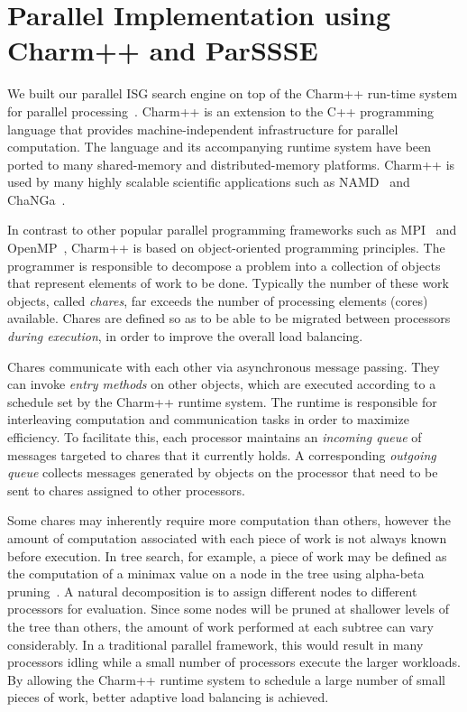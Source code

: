 \documentclass[10pt, conference, compsocconf]{IEEEtran}
\begin{document}
\section{Parallel Implementation using Charm++ and ParSSSE}\label{ParSSSE}
We built our parallel ISG search engine on top of the {\sc Charm++} run-time
system for parallel processing~\cite{kale93charm,kale09charm}.  {\sc Charm++}
is an extension to the C++ programming language that provides
machine-independent infrastructure for parallel computation.  The language and
its accompanying runtime system have been ported to many shared-memory and
distributed-memory platforms. {\sc Charm++} is used by many highly scalable scientific applications such as NAMD~\cite{NAMDIPDPS08} and ChaNGa~\cite{2007_ChaNGaScaling}.

In contrast to other popular parallel programming frameworks such as {\sc MPI}~\cite{MPI}
and {\sc OpenMP}~\cite{OpenMP}, {\sc Charm++} is based on object-oriented
programming principles.  The programmer is responsible to decompose a problem
into a collection of objects that represent elements of work to be done.
Typically the number of these work objects, called {\em chares}, far exceeds
the number of processing elements (cores) available.  Chares are defined
so as to be able to be migrated between processors {\em during execution}, in
order to improve the overall load balancing.  

Chares communicate with each other via
asynchronous message passing.  They can invoke {\em entry methods} on other
objects, which are executed according to a schedule set by the {\sc Charm++}
runtime system.  The runtime is responsible for interleaving computation and
communication tasks in order to maximize efficiency.  To facilitate this, each
processor maintains an {\em incoming queue} of messages targeted to chares that
it currently holds.  A corresponding {\em outgoing queue} collects messages
generated by objects on the processor that need to be sent to chares assigned
to other processors.

Some chares may inherently require more computation than others, however the amount
of computation associated with each piece of work is not always known before
execution.  In tree search, for example, a piece of work may be defined as the
computation of a minimax value on a node in the tree using alpha-beta
pruning~\cite{knuth75analysis,baudet78analysis}.  A natural decomposition is to
assign different nodes to different processors for evaluation.  Since some
nodes will be pruned at shallower levels of the tree than others, the amount of
work performed at each subtree can vary considerably.  In a traditional
parallel framework, this would result in many processors idling while a small
number of processors execute the larger workloads. By allowing the {\sc
Charm++} runtime system to schedule a large number of small pieces of work,
better adaptive load balancing is achieved. 
\end{document}
